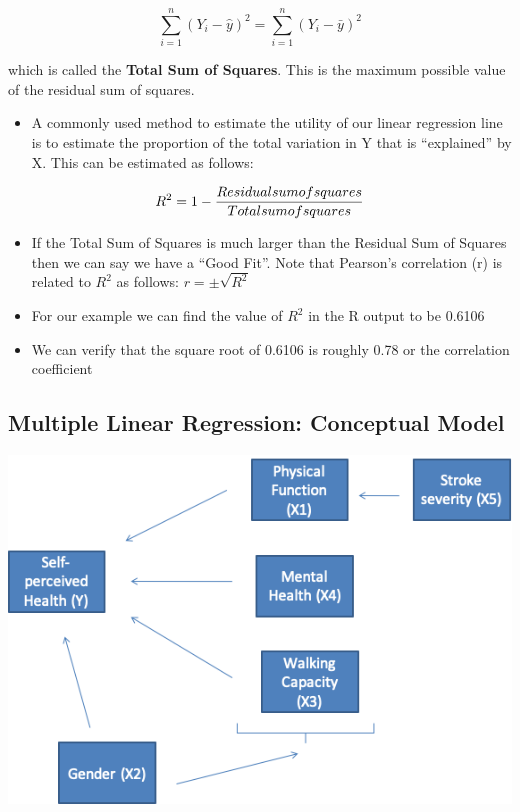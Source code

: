 \documentclass[
]{book}
\providecommand{\tightlist}{%
  \setlength{\itemsep}{0pt}\setlength{\parskip}{0pt}}
\begin{document}
\[\sum_{i=1}^n(Y_i-\hat{y})^2=\sum_{i=1}^n(Y_i-\bar{y})^2\]

which is called the \textbf{Total Sum of Squares}. This is the maximum possible value of the residual sum of squares.

\begin{itemize}
\tightlist
\item
  A commonly used method to estimate the utility of our linear regression line is to estimate the proportion of the total variation in Y that is ``explained'' by X. This can be estimated as follows:
\end{itemize}

\[R^2=1-\frac{Residual\space sum\space of\space squares}{Total\space sum\space of\space squares}\]

\begin{itemize}
\tightlist
\item
  If the Total Sum of Squares is much larger than the Residual Sum of Squares then we can say we have a ``Good Fit''. Note that Pearson's correlation (r) is related to \(R^2\) as follows: \(r=\pm\sqrt{R^2}\)
\item
  For our example we can find the value of \(R^2\) in the R output to be 0.6106
\item
  We can verify that the square root of 0.6106 is roughly 0.78 or the correlation coefficient
\end{itemize}

\hypertarget{multiple-linear-regression-conceptual-model}{%
\subsection{Multiple Linear Regression: Conceptual Model}\label{multiple-linear-regression-conceptual-model}}

\includegraphics[width=1\linewidth]{./12_56}
\end{document}
